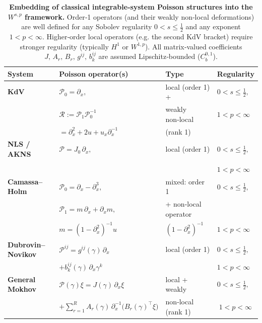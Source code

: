 \documentclass{amsart}
\newcounter{ex}
\newcounter{re}
\begin{document}
\begin{table}[h!]
\centering
\renewcommand{\arraystretch}{1.35}   %
\setlength{\tabcolsep}{3pt}         %
\begin{tabular}{|>{\raggedright\arraybackslash}p{3.2cm}
                |>{\centering\arraybackslash}p{5.8cm}
                |>{\centering\arraybackslash}p{2.8cm}
                |>{\centering\arraybackslash}p{3.2cm}|}
\hline
\textbf{System} &
\textbf{Poisson operator(s)} &
\textbf{Type} &
\textbf{Regularity}\\
\hline
\textbf{KdV} &
\(\displaystyle
   \mathcal P_{0}= \partial_{x},
   \)
             &
local (order 1) +   &
\(0<s\le \tfrac12,\)  \\
&\( \mathcal R:=\mathcal P_{1}\mathcal P_{0}^{-1} \)& weakly non‑local &\(1<p<\infty\)\\
&\(=\partial_{x}^{2}+2u+u_{x}\partial_{x}^{-1}
\)& (rank 1) &\\
\hline
\textbf{NLS / AKNS} &
\(\displaystyle
   \mathcal P = J_{0}\,\partial_{x},
   \)
  &
local (order 1) &
\(0<s\le \tfrac12,\) \\
& \(J_{0}= \begin{pmatrix}0&1\\-1&0\end{pmatrix}
\) && \(1<p<\infty\)\\
\hline
\textbf{Camassa–Holm} &
\(\displaystyle
   \mathcal P_{0}= \partial_{x}-\partial_{x}^{3},\)
    &
mixed: order 1   &
\(0<s\le \tfrac12,\)  \\
& \(
   \mathcal P_{1}= m\,\partial_{x}+\partial_{x}m,\)&+ non‑local operator& \\
   & \(
   m=(1-\partial_{x}^{2})^{-1}u
\) &\((1-\partial_{x}^{2})^{-1}\)& \(1<p<\infty\)\\
\hline
\textbf{Dubrovin–Novikov} &

  \(\mathcal P^{ij}= g^{ij}(\gamma)\,\partial_{x} \)
                   &
local (order 1) &
\(0<s\le \tfrac12,\)  \\
&\(\displaystyle + b^{ij}_{k}(\gamma)\,\partial_{x}\gamma^{k}
\)&& \(1<p<\infty\)\\
\hline
\textbf{General Mokhov} &
\(\displaystyle
   \mathcal P(\gamma)\xi
   = J(\gamma)\,\partial_{x}\xi
\) &
local + weakly  &
\(0<s\le \tfrac12,\) \\
&\( \displaystyle +\sum_{r=1}^{R}
        A_{r}(\gamma)\,\partial_{x}^{-1}
        \bigl(B_{r}(\gamma)^{\!\top}\xi\bigr) \)& non‑local (rank 1) & \(\;1<p<\infty\)\\
\hline
\end{tabular}
\caption{
\textbf{Embedding of classical integrable‑system Poisson structures into the
\(W^{s,p}\) framework.}
Order‑1 operators (and their weakly non‑local deformations) are well defined for
any Sobolev regularity \(0<s\le\tfrac12\) and any exponent \(1<p<\infty\).
Higher‑order local operators (e.g. the second KdV bracket) require stronger
regularity (typically \(H^{1}\) or \(W^{1,p}\)).  All matrix‑valued
coefficients \(J,\,A_{r},\,B_{r},\,g^{ij},\,b^{ij}_{k}\) are assumed
Lipschitz‑bounded (\(C^{0,1}_{b}\)).}
\label{tab:summary}
\end{table}
\end{document}
